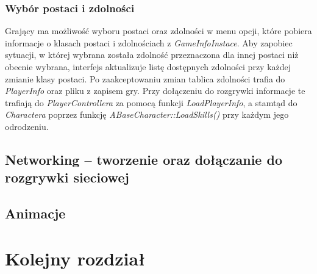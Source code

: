 \documentclass[multip]{SGGW-thesis}
\begin{document}
	\subsection{Wybór postaci i zdolności}
		\label{wybor-postaci}
	Grający ma możliwość wyboru postaci oraz zdolności w menu opcji, które pobiera informacje o klasach postaci i zdolnościach z {\em GameInfoInstace}. Aby zapobiec sytuacji, w której wybrana została zdolność przeznaczona dla innej postaci niż obecnie wybrana, interfejs aktualizuje listę dostępnych zdolności przy każdej zmianie klasy postaci. Po zaakceptowaniu zmian tablica zdolności trafia do {\em PlayerInfo} oraz pliku z zapisem gry. Przy dołączeniu do rozgrywki informacje te trafiają do {\em PlayerControllera} za pomocą funkcji {\em LoadPlayerInfo}, a stamtąd do {\em Charactera} poprzez funkcję {\em ABaseCharacter::LoadSkills()} przy każdym jego odrodzeniu.

\section{Networking -- tworzenie oraz dołączanie do rozgrywki sieciowej}
	\label{networking}

\section{Animacje}


\chapter{Kolejny rozdział}
\end{document}
